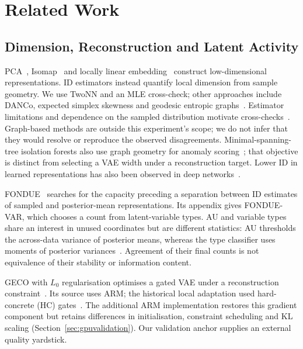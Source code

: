 \section{Related Work}\label{sec:related}

\subsection{Dimension, Reconstruction and Latent Activity}
PCA~\cite{tippingbishop1999ppca}, Isomap~\cite{tenenbaum2000isomap} and
locally linear embedding~\cite{roweis2000lle} construct low-dimensional
representations. ID estimators instead quantify local dimension from
sample geometry. We use TwoNN and an MLE cross-check; other approaches
include DANCo, expected simplex skewness and geodesic entropic
graphs~\cite{ceruti2014danco,johnsson2015ess,costa2004geodesic}.
Estimator limitations and dependence on the sampled distribution motivate
cross-checks~\cite{camastra2016intrinsic,allegra2020data}.
Graph-based methods are outside this experiment's scope; we do not infer
that they would resolve or reproduce the observed disagreements.
Minimal-spanning-tree isolation forests also use graph geometry for
anomaly scoring~\cite{galka2022isolation}; that objective is distinct from
selecting a VAE width under a reconstruction target.
Lower ID in learned representations has also been observed in deep
networks~\cite{ansuini2019intrinsic,pope2021intrinsic}.

FONDUE~\cite{bonheme2022fondue} searches for the capacity preceding a
separation between ID estimates of sampled and posterior-mean
representations. Its appendix gives FONDUE-VAR, which chooses a count from
latent-variable types. AU and variable types share an interest in unused
coordinates but are different statistics: AU thresholds the across-data
variance of posterior means, whereas the type classifier uses moments of
posterior variances~\cite{bonheme2023active}. Agreement of their final
counts is not equivalence of their stability or information content.

GECO with $L_0$ regularisation optimises a gated VAE under a reconstruction
constraint~\cite{deboom2020geco,rezende2018geco}. Its source uses ARM;
the historical local adaptation used hard-concrete (HC)
gates~\cite{louizos2018l0}. The additional ARM implementation restores
this gradient component but retains differences in initialisation,
constraint scheduling and KL scaling (Section~\ref{sec:gpuvalidation}).
Our validation anchor supplies an external quality yardstick.


